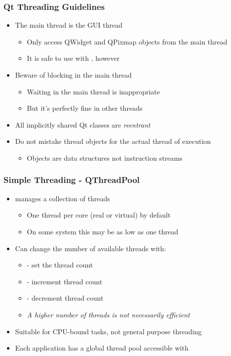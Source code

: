 \begin{slide}
\frametitle{Qt Threading Guidelines}

\begin{itemize}
\item The main thread is the GUI thread
  \begin{itemize}
  \item Only access QWidget and QPixmap objects from the main thread
  \item It is safe to use  with , however
  \end{itemize}
\item Beware of blocking in the main thread
  \begin{itemize}
  \item Waiting in the main thread is inappropriate
  \item But it's perfectly fine in other threads
  \end{itemize}
\item All implicitly shared Qt classes are \textit{reentrant}
\item Do not mistake thread objects for the actual thread of execution
  \begin{itemize}
  \item Objects are data structures not instruction streams
  \end{itemize}
\end{itemize}

\end{slide}


\begin{slide}
\frametitle{Simple Threading - QThreadPool}

\begin{itemize}
\item {} manages a collection of threads
  \begin{itemize}
  \item One thread per core (real or virtual) by default
  \item On some system this may be as low as one thread
  \end{itemize}
\item Can change the number of available threads with:
  \begin{itemize}
  \item {} - set the thread count
  \item {} - increment thread count
  \item {} - decrement thread count
  \item \textit{A higher number of threads is not necessarily efficient}
  \end{itemize}
\item Suitable for CPU-bound tasks, not general purpose threading
\item Each application has a global thread pool accessible with
\end{itemize}

\end{slide}

